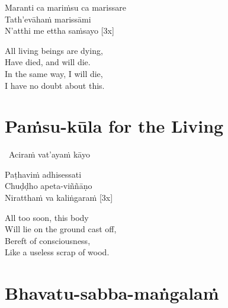\vspace{-0.99em}

\begin{pali-hang-continued}
  Maranti ca mariṁsu ca marissare\\
  Tath'evāhaṁ marissāmi\\
  N'atthi me ettha saṁsayo \hfill{[3x]}
\end{pali-hang-continued}

\begin{english-verses}
  All living beings are dying,\\
  Have died, and will die.\\
  In the same way, I will die,\\
  I have no doubt about this.
\end{english-verses}

\suttaRef{[Thai]}

\section{Paṁsu-kūla for the Living}
\label{pamsu-kula-living}

\begin{leader-only}
  \anglebracketleft\ \hspace{-0.5mm}Aciraṁ vat'ayaṁ kāyo \hspace{-0.5mm}\anglebracketright\
\end{leader-only}

\vspace{-0.99em}

\begin{pali-hang}
  Paṭhaviṁ adhisessati\\
  Chuḍḍho apeta-viññāṇo\\
  Niratthaṁ va kaliṅgaraṁ \hfill{[3x]}
\end{pali-hang}

\begin{english-verses}
  All too soon, this body\\
  Will lie on the ground cast off,\\
  Bereft of consciousness,\\
  Like a useless scrap of wood.
\end{english-verses}

\suttaRef{[Dhp 41]}

\section{Bhavatu-sabba-maṅgalaṁ}
\label{bhavatu}

